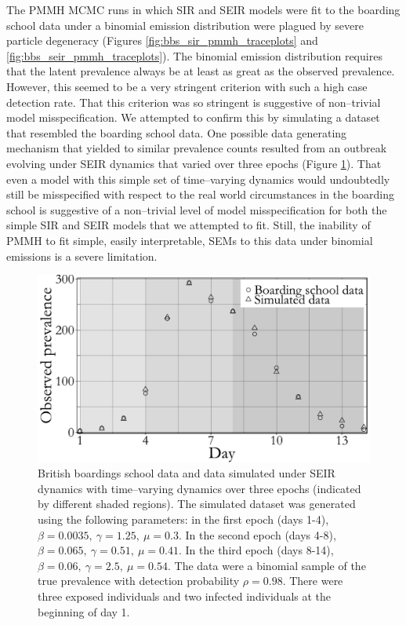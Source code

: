 The PMMH MCMC runs in which SIR and SEIR models were fit to the boarding school data under a binomial emission distribution were plagued by severe particle degeneracy (Figures \ref{fig:bbs_sir_pmmh_traceplots} and \ref{fig:bbs_seir_pmmh_traceplots}). The binomial emission distribution requires that the latent prevalence always be at least as great as the observed prevalence. However, this seemed to be a very stringent criterion with such a high case detection rate. That this criterion was so stringent is suggestive of non--trivial model misspecification. We attempted to confirm this by simulating a dataset that resembled the boarding school data. One possible data generating mechanism that yielded to similar prevalence counts resulted from an outbreak evolving under SEIR dynamics that varied over three epochs (Figure \ref{fig:bbs_dat_sim}). That even a model with this simple set of time--varying dynamics would undoubtedly still be misspecified with respect to the real world circumstances in the boarding school is suggestive of a non--trivial level of model misspecification for both the simple SIR and SEIR models that we attempted to fit. Still, the inability of PMMH to fit simple, easily interpretable, SEMs to this data under binomial emissions is a severe limitation.

\begin{figure}[htbp]
	\centering
	\includegraphics[width=0.6\linewidth]{figures/bbs_dat_sim.pdf}
	\caption[Comparison of boarding school outbreak data and data simulated using an SEIR model with time--varying dynamics.]{British boardings school data and data simulated under SEIR dynamics with time--varying dynamics over three epochs (indicated by different shaded regions). The simulated dataset was generated using the following parameters: in the first epoch (days 1-4), $ \beta = 0.0035,\ \gamma = 1.25,\  \mu = 0.3$. In the second epoch (days 4-8), $ \beta = 0.065,\ \gamma = 0.51,\ \mu = 0.41 $. In the third epoch (days 8-14), $ \beta = 0.06,\ \gamma = 2.5,\ \mu=0.54 $. The data were a binomial sample of the true prevalence with detection probability $ \rho = 0.98 $. There were three exposed individuals and two infected individuals at the beginning of day 1.}
	\label{fig:bbs_dat_sim}
\end{figure}

